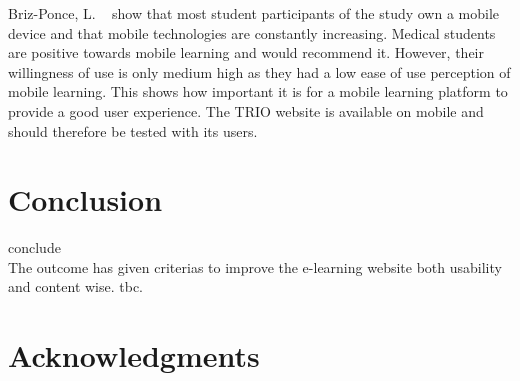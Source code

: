 \documentclass{sigchi}
\begin{document}
Briz-Ponce, L. ~\cite{Briz-Ponce2017} show that most student participants of the study own a mobile device and that mobile technologies are constantly increasing. Medical students are positive towards mobile learning and would recommend it. However, their willingness of use is only medium high as they had a low ease of use perception of mobile learning. This shows how important it is for a mobile learning platform to provide a good user experience. The TRIO website is available on mobile and should therefore be tested with its users. 

\section{Conclusion}
conclude \\
The outcome has given criterias to improve the e-learning website both usability and content wise. tbc.
 
\section{Acknowledgments}

\balance{}



\end{document}
